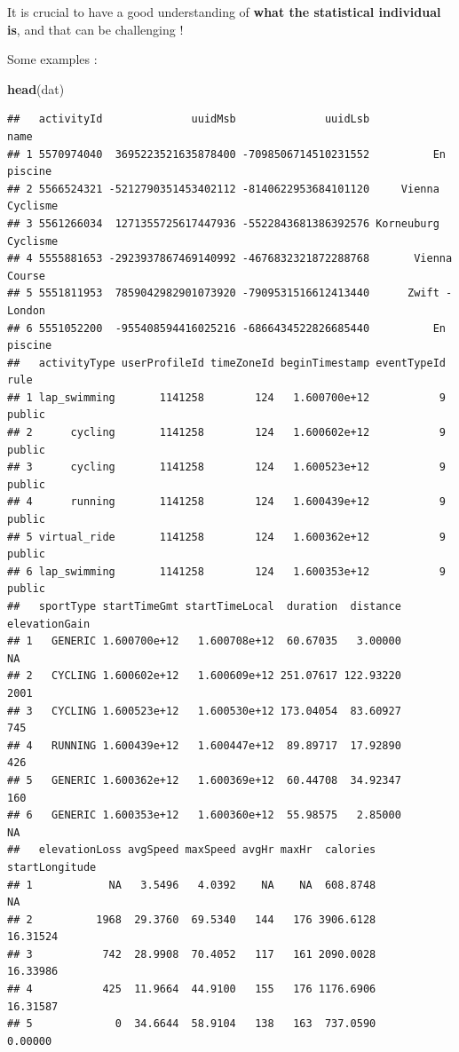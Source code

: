 \documentclass[
]{book}
\newenvironment{Shaded}{\begin{snugshade}}{\end{snugshade}}
\newcommand{\KeywordTok}[1]{\textcolor[rgb]{0.13,0.29,0.53}{\textbf{#1}}}
\newcommand{\NormalTok}[1]{#1}
\begin{document}
It is crucial to have a good understanding of \textbf{what the statistical individual is}, and that can be challenging !

Some examples :

\begin{Shaded}
\begin{Highlighting}[]
\KeywordTok{head}\NormalTok{(dat)}
\end{Highlighting}
\end{Shaded}

\begin{verbatim}
##   activityId              uuidMsb              uuidLsb                name
## 1 5570974040  3695223521635878400 -7098506714510231552          En piscine
## 2 5566524321 -5212790351453402112 -8140622953684101120     Vienna Cyclisme
## 3 5561266034  1271355725617447936 -5522843681386392576 Korneuburg Cyclisme
## 4 5555881653 -2923937867469140992 -4676832321872288768       Vienna Course
## 5 5551811953  7859042982901073920 -7909531516612413440      Zwift - London
## 6 5551052200  -955408594416025216 -6866434522826685440          En piscine
##   activityType userProfileId timeZoneId beginTimestamp eventTypeId   rule
## 1 lap_swimming       1141258        124   1.600700e+12           9 public
## 2      cycling       1141258        124   1.600602e+12           9 public
## 3      cycling       1141258        124   1.600523e+12           9 public
## 4      running       1141258        124   1.600439e+12           9 public
## 5 virtual_ride       1141258        124   1.600362e+12           9 public
## 6 lap_swimming       1141258        124   1.600353e+12           9 public
##   sportType startTimeGmt startTimeLocal  duration  distance elevationGain
## 1   GENERIC 1.600700e+12   1.600708e+12  60.67035   3.00000            NA
## 2   CYCLING 1.600602e+12   1.600609e+12 251.07617 122.93220          2001
## 3   CYCLING 1.600523e+12   1.600530e+12 173.04054  83.60927           745
## 4   RUNNING 1.600439e+12   1.600447e+12  89.89717  17.92890           426
## 5   GENERIC 1.600362e+12   1.600369e+12  60.44708  34.92347           160
## 6   GENERIC 1.600353e+12   1.600360e+12  55.98575   2.85000            NA
##   elevationLoss avgSpeed maxSpeed avgHr maxHr  calories startLongitude
## 1            NA   3.5496   4.0392    NA    NA  608.8748             NA
## 2          1968  29.3760  69.5340   144   176 3906.6128       16.31524
## 3           742  28.9908  70.4052   117   161 2090.0028       16.33986
## 4           425  11.9664  44.9100   155   176 1176.6906       16.31587
## 5             0  34.6644  58.9104   138   163  737.0590        0.00000

\end{verbatim}
\end{document}
